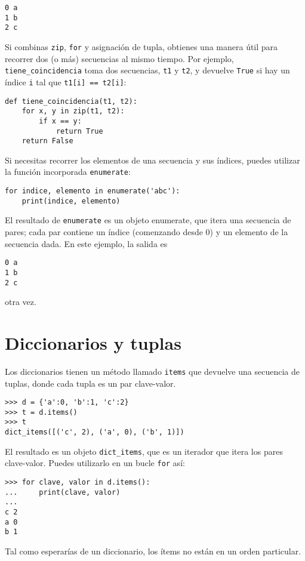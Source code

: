 \documentclass[10pt]{book}
\begin{document}
\begin{verbatim}
0 a
1 b
2 c
\end{verbatim}
%
Si combinas {\tt zip}, {\tt for} y asignación de tupla, obtienes una
manera útil para recorrer dos (o más) secuencias al mismo
tiempo.  Por ejemplo, \verb"tiene_coincidencia" toma dos secuencias, {\tt t1} y
{\tt t2}, y devuelve {\tt True} si hay un índice {\tt i}
tal que {\tt t1[i] == t2[i]}:

\begin{verbatim}
def tiene_coincidencia(t1, t2):
    for x, y in zip(t1, t2):
        if x == y:
            return True
    return False
\end{verbatim}
%
Si necesitas recorrer los elementos de una secuencia y sus
índices, puedes utilizar la función incorporada {\tt enumerate}:

\begin{verbatim}
for indice, elemento in enumerate('abc'):
    print(indice, elemento)
\end{verbatim}
%
El resultado de {\tt enumerate} es un objeto enumerate, que
itera una secuencia de pares; cada par contiene un índice (comenzando
desde 0) y un elemento de la secuencia dada.
En este ejemplo, la salida es

\begin{verbatim}
0 a
1 b
2 c
\end{verbatim}
%
otra vez.


\section{Diccionarios y tuplas}
\label{dictuple}

Los diccionarios tienen un método llamado {\tt items} que devuelve una secuencia de
tuplas, donde cada tupla es un par clave-valor.

\begin{verbatim}
>>> d = {'a':0, 'b':1, 'c':2}
>>> t = d.items()
>>> t
dict_items([('c', 2), ('a', 0), ('b', 1)])
\end{verbatim}
%
El resultado es un objeto \verb"dict_items", que es un iterador que
itera los pares clave-valor.  Puedes utilizarlo en un bucle {\tt for}
así:

\begin{verbatim}
>>> for clave, valor in d.items():
...     print(clave, valor)
...
c 2
a 0
b 1
\end{verbatim}
%
Tal como esperarías de un diccionario, los ítems no están en un
orden particular.
\end{document}
